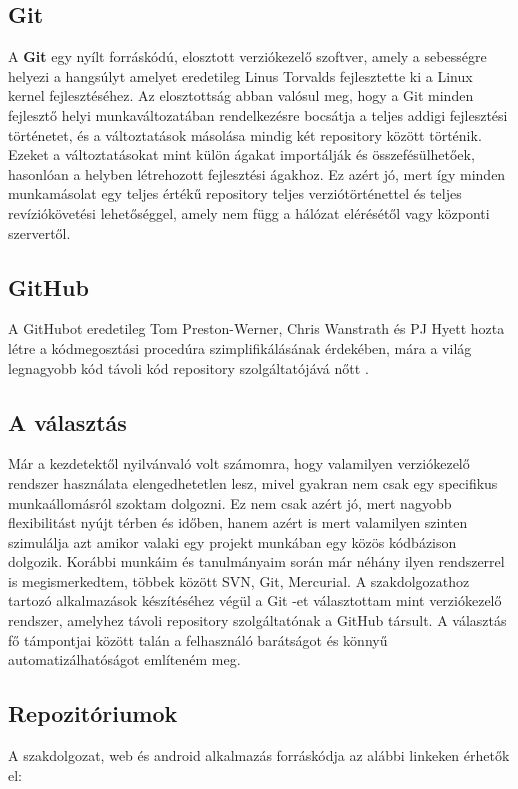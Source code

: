 \documentclass[12pt]{report}
\theoremstyle{definition}
\begin{document}
	\subsection{Git}
	A \textbf{Git} egy nyílt forráskódú, elosztott verziókezelő szoftver, amely a sebességre helyezi a hangsúlyt amelyet eredetileg Linus Torvalds fejlesztette ki a Linux kernel fejlesztéséhez. Az elosztottság abban valósul meg, hogy a Git minden fejlesztő helyi munkaváltozatában rendelkezésre bocsátja a teljes addigi fejlesztési történetet, és a változtatások másolása mindig két repository között történik. Ezeket a változtatásokat mint külön ágakat importálják és összefésülhetőek, hasonlóan a helyben létrehozott fejlesztési ágakhoz. Ez azért jó, mert így minden munkamásolat egy teljes értékű repository teljes verziótörténettel és teljes revíziókövetési lehetőséggel, amely nem függ a hálózat elérésétől vagy központi szervertől.
	
	\subsection{GitHub}
	A GitHubot eredetileg Tom Preston-Werner, Chris Wanstrath és PJ Hyett hozta létre a kódmegosztási procedúra szimplifikálásának érdekében, mára a világ legnagyobb kód távoli kód repository szolgáltatójává nőtt \cite{Github}.
	
	\subsection{A választás} Már a kezdetektől nyilvánvaló volt számomra, hogy valamilyen verziókezelő rendszer használata elengedhetetlen lesz, mivel gyakran nem csak egy specifikus munkaállomásról szoktam dolgozni. Ez nem csak azért jó, mert nagyobb flexibilitást nyújt térben és időben, hanem azért is mert valamilyen szinten szimulálja azt amikor valaki egy projekt munkában egy közös kódbázison dolgozik. Korábbi munkáim és tanulmányaim során már néhány ilyen rendszerrel is megismerkedtem, többek között SVN, Git, Mercurial. A szakdolgozathoz tartozó alkalmazások készítéséhez végül a Git -et választottam mint verziókezelő rendszer, amelyhez távoli repository szolgáltatónak a GitHub társult. A választás fő támpontjai között talán a felhasználó barátságot és könnyű automatizálhatóságot említeném meg. 
	
	\subsection{Repozitóriumok}
	A szakdolgozat, web és android alkalmazás forráskódja az alábbi linkeken érhetők el:
	
\end{document}
